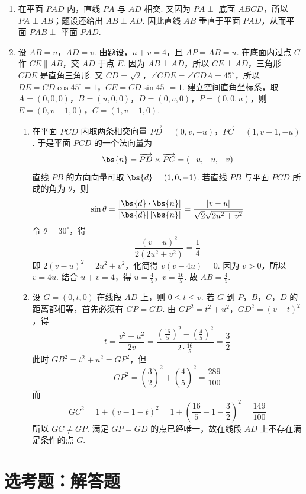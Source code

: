 \begin{solution}
\begin{enumerate}
\item 在平面 \(PAD\) 内，直线 \(PA\) 与 \(AD\) 相交. 又因为 \(PA\perp\) 底面 \(ABCD\)，所以 \(PA\perp AB\)；题设还给出 \(AB\perp AD\). 因此直线 \(AB\) 垂直于平面 \(PAD\)，从而平面 \(PAB\perp\) 平面 \(PAD\).

\item 设 \(AB=u\)，\(AD=v\). 由题设，\(u+v=4\)，且 \(AP=AB=u\). 在底面内过点 \(C\) 作 \(CE\parallel AB\)，交 \(AD\) 于点 \(E\). 因为 \(AB\perp AD\)，所以 \(CE\perp AD\)，三角形 \(CDE\) 是直角三角形. 又 \(CD=\sqrt{2}\)，\(\angle CDE=\angle CDA=45^\circ\)，所以 \(DE=CD\cos45^\circ=1\)，\(CE=CD\sin45^\circ=1\). 建立空间直角坐标系，取 \(A=(0,0,0)\)，\(B=(u,0,0)\)，\(D=(0,v,0)\)，\(P=(0,0,u)\)，则 \(E=(0,v-1,0)\)，\(C=(1,v-1,0)\).

\begin{enumerate}
\item 在平面 \(PCD\) 内取两条相交向量 \(\overrightarrow{PD}=(0,v,-u)\)，\(\overrightarrow{PC}=(1,v-1,-u)\). 于是平面 \(PCD\) 的一个法向量为
\[
\bs{n}=\overrightarrow{PD}\times\overrightarrow{PC}=(-u,-u,-v)
\]
直线 \(PB\) 的方向向量可取 \(\bs{d}=(1,0,-1)\). 若直线 \(PB\) 与平面 \(PCD\) 所成的角为 \(\theta\)，则
\[
\sin\theta=\frac{|\bs{d}\cdot\bs{n}|}{|\bs{d}|\,|\bs{n}|}=\frac{|v-u|}{\sqrt{2}\sqrt{2u^2+v^2}}
\]
令 \(\theta=30^\circ\)，得
\[
\frac{(v-u)^2}{2(2u^2+v^2)}=\frac{1}{4}
\]
即 \(2(v-u)^2=2u^2+v^2\)，化简得 \(v(v-4u)=0\). 因为 \(v>0\)，所以 \(v=4u\). 结合 \(u+v=4\)，得
\(u=\frac{4}{5}\)，\(v=\frac{16}{5}\).
故 \(AB=\frac{4}{5}\).

\item 设 \(G=(0,t,0)\) 在线段 \(AD\) 上，则 \(0\leqslant t\leqslant v\). 若 \(G\) 到 \(P\)，\(B\)，\(C\)，\(D\) 的距离都相等，首先必须有 \(GP=GD\). 由 \(GP^2=t^2+u^2\)，\(GD^2=(v-t)^2\)，得
\[
t=\frac{v^2-u^2}{2v}=\frac{(\frac{16}{5})^2-(\frac{4}{5})^2}{2\cdot\frac{16}{5}}=\frac{3}{2}
\]
此时 \(GB^2=t^2+u^2=GP^2\)，但
\[
GP^2=\left(\frac{3}{2}\right)^2+\left(\frac{4}{5}\right)^2=\frac{289}{100}
\]
而
\[
GC^2=1+\left(v-1-t\right)^2=1+\left(\frac{16}{5}-1-\frac{3}{2}\right)^2=\frac{149}{100}
\]
所以 \(GC\ne GP\). 满足 \(GP=GD\) 的点已经唯一，故在线段 \(AD\) 上不存在满足条件的点 \(G\).
\end{enumerate}
\end{enumerate}
\end{solution}

\section{选考题：解答题}

